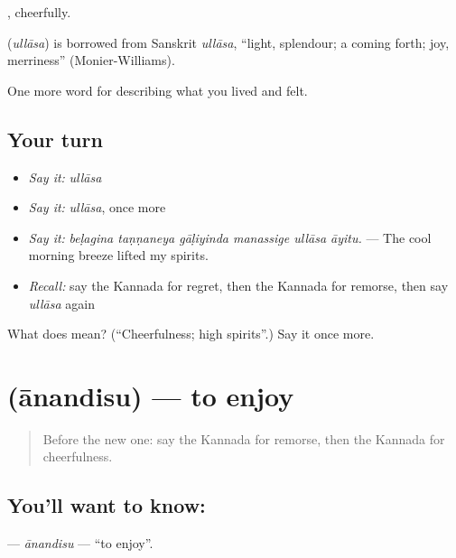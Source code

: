 , cheerfully.

\begin{cousinweb}
\textbf{} (\emph{ullāsa}) is borrowed from Sanskrit \emph{ullāsa}, \textquotedblleft{}light, splendour; a coming forth; joy, merriness\textquotedblright{} (Monier-Williams).
\end{cousinweb}

\begin{grammarlens}[title={What you've built}]
One more word for describing what you lived and felt.
\end{grammarlens}

\subsection*{Your turn}
\begin{itemize}
\raggedright
  \item \emph{Say it:} \emph{ullāsa}
  \item \emph{Say it:} \emph{ullāsa}, once more
  \item \emph{Say it:} \emph{beḷagina taṇṇaneya gāḷiyinda manassige ullāsa āyitu.} — The cool morning breeze lifted my spirits.
  \item \emph{Recall:} say the Kannada for regret, then the Kannada for remorse, then say \emph{ullāsa} again
\end{itemize}

\begin{tcolorbox}[breakable,colback=teal!4,colframe=teal!35!black,title={Before you move on}]
What does  mean? (\textquotedblleft{}Cheerfulness; high spirits\textquotedblright{}.) Say it once more.
\end{tcolorbox}
\section[\texorpdfstring{\kn{ಆನಂದಿಸು} (ānandisu)}{ಆನಂದಿಸು (ānandisu)}]{ (ānandisu) — to enjoy}

\label{lesson:KA-C492-anandisu}



\begin{quote}
Before the new one: say the Kannada for remorse, then the Kannada for cheerfulness.
\end{quote}

\subsection*{You'll want to know: }
\textbf{} — \emph{ānandisu} — \textquotedblleft{}to enjoy\textquotedblright{}.

